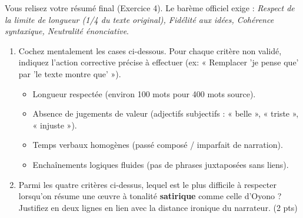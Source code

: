 \documentclass[11pt]{article}
\begin{document}
\begin{exercice}
Vous relisez votre résumé final (Exercice 4). Le barème officiel exige : \textit{Respect de la limite de longueur (1/4 du texte original), Fidélité aux idées, Cohérence syntaxique, Neutralité énonciative}.
\begin{enumerate}
    \item Cochez mentalement les cases ci-dessous. Pour chaque critère non validé, indiquez l'action corrective précise à effectuer (ex: « Remplacer 'je pense que' par 'le texte montre que' »).
    \begin{itemize}
        \item [ ] Longueur respectée (environ 100 mots pour 400 mots source).
        \item [ ] Absence de jugements de valeur (adjectifs subjectifs : « belle », « triste », « injuste »).
        \item [ ] Temps verbaux homogènes (passé composé / imparfait de narration).
        \item [ ] Enchaînements logiques fluides (pas de phrases juxtaposées sans liens).
    \end{itemize}
    \item Parmi les quatre critères ci-dessus, lequel est le plus difficile à respecter lorsqu'on résume une œuvre à tonalité \textbf{satirique} comme celle d'Oyono ? Justifiez en deux lignes en lien avec la distance ironique du narrateur. (2 pts)
\end{enumerate}
\end{exercice}
\end{document}
